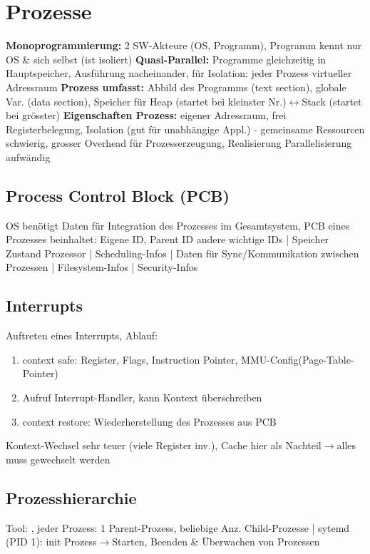 \section{Prozesse}
\textbf{Monoprogrammierung: }2 SW-Akteure (OS, Programm), Programm kennt nur OS \& sich selbst (ist isoliert)
\textbf{Quasi-Parallel: }Programme gleichzeitig in Hauptspeicher, Ausführung nacheinander, für Isolation: jeder Prozess virtueller Adressraum
\textbf{Prozess umfasst: }Abbild des Programms (text section), globale Var. (data section), Speicher für Heap (startet bei kleinster Nr.)$\leftrightarrow$Stack (startet bei grösster) \textbf{Eigenschaften Prozess: }eigener Adressraum, frei Registerbelegung, Isolation (gut für unabhängige Appl.) \textcolor{red}{-} gemeinsame Ressourcen schwierig, grosser Overhead für Prozesserzeugung, Realisierung Parallelisierung aufwändig
\subsection{Process Control Block (PCB)}
OS benötigt Daten für Integration des Prozesses im Gesamtsystem, PCB eines Prozesses beinhaltet: Eigene ID, Parent ID andere wichtige IDs | Speicher Zustand Prozessor | Scheduling-Infos | Daten für Sync/Kommunikation zwischen Prozessen | Filesystem-Infos | Security-Infos

\subsection{Interrupts}
Auftreten eines Interrupts, Ablauf:
\begin{enumerate}
    \item context safe: Register, Flags, Instruction Pointer, MMU-Config(Page-Table-Pointer)
    \item Aufruf Interrupt-Handler, kann Kontext überschreiben
    \item context restore: Wiederherstellung des Prozesses aus PCB
\end{enumerate}
Kontext-Wechsel sehr teuer (viele Register inv.), Cache hier als Nachteil$\rightarrow$alles muss gewechselt werden


\subsection{Prozesshierarchie}
Tool: , jeder Prozess: 1 Parent-Prozess, beliebige Anz. Child-Prozesse | sytemd (PID 1): init Prozess$\rightarrow$Starten, Beenden \& Überwachen von Prozessen

